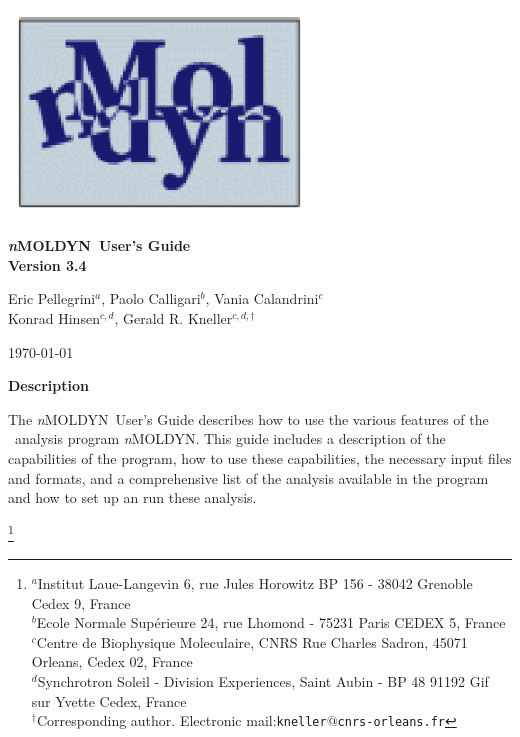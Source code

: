 \documentclass[a4paper,11pt]{report}
\newcommand{\NMOLDYN}{\textit{n}MOLDYN}
\begin{document}
\begin{titlepage}

\begin{center}

\includegraphics[width=0.60\textwidth]{./Figures/logo.eps}

\vspace{2cm}
 
\vspace{0.5cm}
{\Huge \bfseries \NMOLDYN\ User's Guide}\\
\vspace{0.5cm}
{\huge \bfseries Version 3.4}
\vspace{0.5cm}

\vspace{1.5cm}

{\Large Eric Pellegrini$^{a}$, Paolo Calligari$^{b}$, Vania Calandrini$^{c}$}\\
\vspace{0.5cm}
{\Large Konrad Hinsen$^{c,d}$, Gerald R. Kneller$^{c,d,\dag}$}\\

\vspace{1.0cm}
 
{\large \today}\\

\vspace{1.0cm}

{\large \textbf{Description}}\\

\end{center}

\noindent The \NMOLDYN\ User's Guide describes how to use the various features of the \MD\ analysis program 
\NMOLDYN. This guide includes a description of the capabilities of the program, how to use these capabilities, the necessary 
input files and formats, and a comprehensive list of the analysis available in the program and how to set up an run these analysis.

\footnote{$^{a}$Institut Laue-Langevin 6, rue Jules Horowitz BP 156 - 38042 Grenoble Cedex 9, France\\
$^{b}$Ecole Normale Sup\'erieure 24, rue Lhomond - 75231 Paris CEDEX 5, France\\
$^{c}$Centre de Biophysique Moleculaire, CNRS Rue Charles Sadron, 45071 Orleans, Cedex 02, France\\
$^{d}$Synchrotron Soleil - Division Experiences, Saint Aubin - BP 48 91192 Gif sur Yvette Cedex, France\\
$^{\dag}$Corresponding author. Electronic mail:{\tt kneller$@$cnrs-orleans.fr}}

\end{titlepage}
\end{document}
